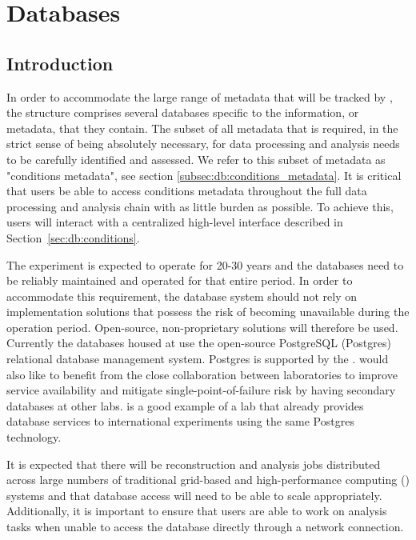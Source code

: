 \documentclass[../main-v1.tex]{subfiles}
\begin{document}
\chapter{Databases }
\label{ch:db}

\section{Introduction   }
\label{sec:db:intro} 

In order to accommodate the large range of metadata that will be tracked by , the   structure comprises several databases specific to the information, or metadata, that they contain. 
The subset of all  metadata that is required, in the strict sense of being absolutely necessary, for data processing and analysis needs to be carefully identified and assessed.  We refer to this subset of metadata as "conditions metadata", see section \ref{subsec:db:conditions_metadata}.
It is critical that users be able to access conditions metadata throughout the full data processing and analysis chain with as little burden as possible. To achieve this, users will interact with a centralized high-level interface   described in Section~\ref{sec:db:conditions}.

The  experiment is expected to operate for 20-30 years and the  databases need to be reliably maintained and operated for that entire period. In order to accommodate this requirement, the database system should not rely on implementation solutions that possess the risk of becoming unavailable during the operation period. Open-source, non-proprietary solutions will therefore be used. Currently the databases housed at  use the open-source PostgreSQL (Postgres) relational database management system. Postgres is supported by the .       
 would also like to benefit from the close collaboration between  laboratories to improve service availability and mitigate single-point-of-failure risk by having secondary databases at other  labs.   is a good example of a lab that already provides database services to international experiments using the same Postgres technology.

It is expected that there will be reconstruction and analysis jobs distributed across large numbers of traditional grid-based and high-performance computing () systems and that database access will need to be able to scale appropriately. Additionally, it is important to ensure that users are able to work on analysis tasks when unable to access the database directly through a network connection. 
\end{document}
